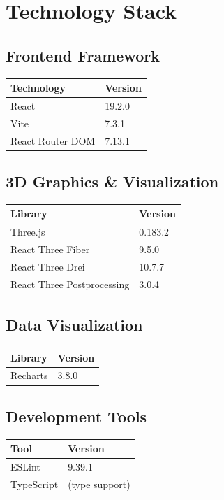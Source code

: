 \documentclass[12pt,a4paper]{article}
\begin{document}
\section{Technology Stack}

\subsection{Frontend Framework}
\begin{tabular}{@{}ll@{}}
    \toprule
    \textbf{Technology} & \textbf{Version} \\
    \midrule
    React              & 19.2.0 \\
    Vite               & 7.3.1 \\
    React Router DOM   & 7.13.1 \\
    \bottomrule
\end{tabular}

\subsection{3D Graphics \& Visualization}
\begin{tabular}{@{}ll@{}}
    \toprule
    \textbf{Library} & \textbf{Version} \\
    \midrule
    Three.js                      & 0.183.2 \\
    React Three Fiber             & 9.5.0 \\
    React Three Drei              & 10.7.7 \\
    React Three Postprocessing    & 3.0.4 \\
    \bottomrule
\end{tabular}

\subsection{Data Visualization}
\begin{tabular}{@{}ll@{}}
    \toprule
    \textbf{Library} & \textbf{Version} \\
    \midrule
    Recharts & 3.8.0 \\
    \bottomrule
\end{tabular}

\subsection{Development Tools}
\begin{tabular}{@{}ll@{}}
    \toprule
    \textbf{Tool} & \textbf{Version} \\
    \midrule
    ESLint     & 9.39.1 \\
    TypeScript & (type support) \\
    \bottomrule
\end{tabular}
\end{document}
